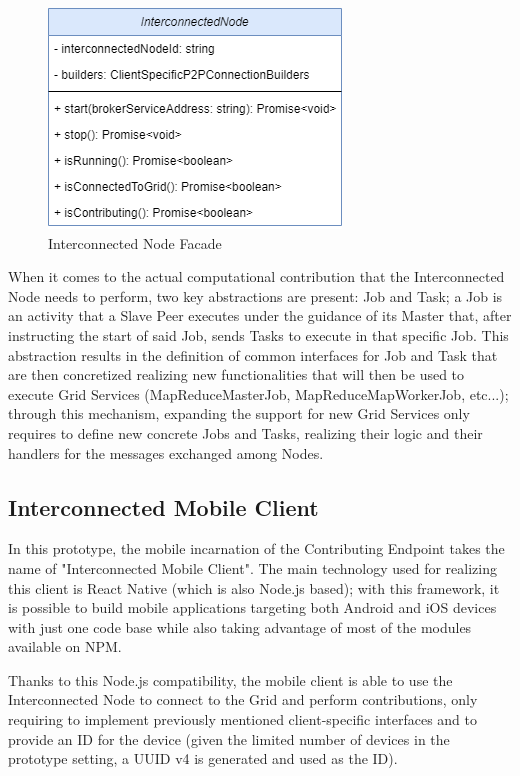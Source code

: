 \begin{figure}[!ht]
    \centering
    \includegraphics[scale=0.6]{document/chapters/chapter_7/images/interconnected_node_facade.png}
    \caption{Interconnected Node Facade}
    \label{fig:interconnected_node_facade}
\end{figure}

When it comes to the actual computational contribution that the Interconnected Node needs to perform, two key abstractions are present: Job and Task; a Job is an activity that a Slave Peer executes under the guidance of its Master that, after instructing the start of said Job, sends Tasks to execute in that specific Job. This abstraction results in the definition of common interfaces for Job and Task that are then concretized realizing new functionalities that will then be used to execute Grid Services (MapReduceMasterJob, MapReduceMapWorkerJob, etc...); through this mechanism, expanding the support for new Grid Services only requires to define new concrete Jobs and Tasks, realizing their logic and their handlers for the messages exchanged among Nodes.

\subsection{Interconnected Mobile Client}
In this prototype, the mobile incarnation of the Contributing Endpoint takes the name of "Interconnected Mobile Client". The main technology used for realizing this client is React Native (which is also Node.js based); with this framework, it is possible to build mobile applications targeting both Android and iOS devices with just one code base while also taking advantage of most of the modules available on NPM.

Thanks to this Node.js compatibility, the mobile client is able to use the Interconnected Node to connect to the Grid and perform contributions, only requiring to implement previously mentioned client-specific interfaces and to provide an ID for the device (given the limited number of devices in the prototype setting, a UUID v4 is generated and used as the ID).

